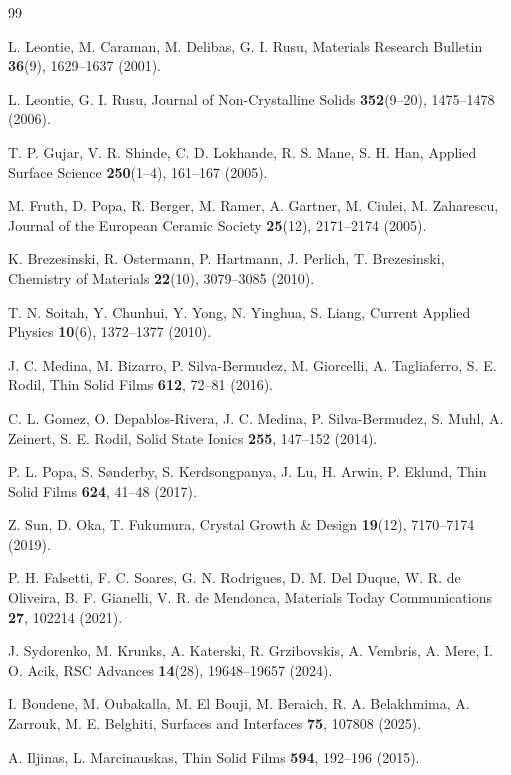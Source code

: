 \documentclass[10pt]{NSP1}
\begin{document}
\begin{thebibliography}{99}
\setlength{\itemsep}{0.8pt plus 0.2pt}
\setlength{\parskip}{0pt}

 L. Leontie, M. Caraman, M. Delibas, G. I. Rusu, Materials Research Bulletin \textbf{36}(9), 1629--1637 (2001).

 L. Leontie, G. I. Rusu, Journal of Non-Crystalline Solids \textbf{352}(9--20), 1475--1478 (2006).

 T. P. Gujar, V. R. Shinde, C. D. Lokhande, R. S. Mane, S. H. Han, Applied Surface Science \textbf{250}(1--4), 161--167 (2005).

 M. Fruth, D. Popa, R. Berger, M. Ramer, A. Gartner, M. Ciulei, M. Zaharescu, Journal of the European Ceramic Society \textbf{25}(12), 2171--2174 (2005).

 K. Brezesinski, R. Ostermann, P. Hartmann, J. Perlich, T. Brezesinski, Chemistry of Materials \textbf{22}(10), 3079--3085 (2010).

 T. N. Soitah, Y. Chunhui, Y. Yong, N. Yinghua, S. Liang, Current Applied Physics \textbf{10}(6), 1372--1377 (2010).

 J. C. Medina, M. Bizarro, P. Silva-Bermudez, M. Giorcelli, A. Tagliaferro, S. E. Rodil, Thin Solid Films \textbf{612}, 72--81 (2016).

 C. L. Gomez, O. Depablos-Rivera, J. C. Medina, P. Silva-Bermudez, S. Muhl, A. Zeinert, S. E. Rodil, Solid State Ionics \textbf{255}, 147--152 (2014).

 P. L. Popa, S. S{\o}nderby, S. Kerdsongpanya, J. Lu, H. Arwin, P. Eklund, Thin Solid Films \textbf{624}, 41--48 (2017).

 Z. Sun, D. Oka, T. Fukumura, Crystal Growth \& Design \textbf{19}(12), 7170--7174 (2019).

 P. H. Falsetti, F. C. Soares, G. N. Rodrigues, D. M. Del Duque, W. R. de Oliveira, B. F. Gianelli, V. R. de Mendonca, Materials Today Communications \textbf{27}, 102214 (2021).

 J. Sydorenko, M. Krunks, A. Katerski, R. Grzibovskis, A. Vembris, A. Mere, I. O. Acik, RSC Advances \textbf{14}(28), 19648--19657 (2024).

 I. Boudene, M. Oubakalla, M. El Bouji, M. Beraich, R. A. Belakhmima, A. Zarrouk, M. E. Belghiti, Surfaces and Interfaces \textbf{75}, 107808 (2025).

 A. Iljinas, L. Marcinauskas, Thin Solid Films \textbf{594}, 192--196 (2015).


\end{thebibliography}
\end{document}
